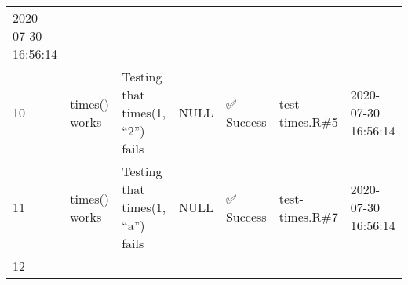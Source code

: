 \documentclass[
]{book}
\begin{document}
\begin{longtable}[]{@{}lllllll@{}}
\begin{minipage}[t]{0.08\columnwidth}
2020-07-30 16:56:14\strut
\end{minipage}\tabularnewline
\begin{minipage}[t]{0.01\columnwidth}\raggedright
10\strut
\end{minipage} & \begin{minipage}[t]{0.14\columnwidth}\raggedright
times() works\strut
\end{minipage} & \begin{minipage}[t]{0.25\columnwidth}\raggedright
Testing that times(1, ``2'') fails\strut
\end{minipage} & \begin{minipage}[t]{0.05\columnwidth}\raggedright
NULL\strut
\end{minipage} & \begin{minipage}[t]{0.22\columnwidth}\raggedright
✅ Success\strut
\end{minipage} & \begin{minipage}[t]{0.06\columnwidth}\raggedright
test-times.R\#5\strut
\end{minipage} & \begin{minipage}[t]{0.08\columnwidth}\raggedright
2020-07-30 16:56:14\strut
\end{minipage}\tabularnewline
\begin{minipage}[t]{0.01\columnwidth}\raggedright
11\strut
\end{minipage} & \begin{minipage}[t]{0.14\columnwidth}\raggedright
times() works\strut
\end{minipage} & \begin{minipage}[t]{0.25\columnwidth}\raggedright
Testing that times(1, ``a'') fails\strut
\end{minipage} & \begin{minipage}[t]{0.05\columnwidth}\raggedright
NULL\strut
\end{minipage} & \begin{minipage}[t]{0.22\columnwidth}\raggedright
✅ Success\strut
\end{minipage} & \begin{minipage}[t]{0.06\columnwidth}\raggedright
test-times.R\#7\strut
\end{minipage} & \begin{minipage}[t]{0.08\columnwidth}\raggedright
2020-07-30 16:56:14\strut
\end{minipage}\tabularnewline
\begin{minipage}[t]{0.01\columnwidth}\raggedright
12\strut
\end{minipage} & \begin{minipage}[t]{0.14\columnwidth}\raggedright

\end{minipage}
\end{longtable}
\end{document}
